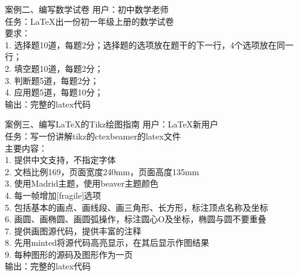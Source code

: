 \documentclass[aspectratio=169]{beamer}
\begin{document}
\begin{frame}[t]{案例二、编写数学试卷}
\fontsize{10pt}{14pt}\selectfont
\alert{用户：初中数学老师}\\
\alert{任务：LaTeX出一份初一年级上册的数学试卷}\\
要求：\\
1. 选择题10道，每题2分；选择题的选项放在题干的下一行，4个选项放在同一行；\\
2. 填空题10道，每题2分；\\
3. 判断题5道，每题2分；\\
4. 应用题5道，每题10分；\\
\alert{输出：完整的latex代码}
\end{frame}

\begin{frame}[t]{案例三、编写LaTeX的Tikz绘图指南}
\fontsize{12pt}{14pt}\selectfont
\alert{用户：LaTeX新用户}\\
\alert{任务：写一份讲解tikz的ctexbeamer的latex文件}\\
主要内容：\\
1. 提供中文支持，不指定字体\\
2. 文档比例169，页面宽度240mm，页面高度135mm\\
3. 使用Madrid主题，使用beaver主题颜色\\
4. 每一帧增加[fragile]选项\\
5. 包括基本的画点、画线段、画三角形、长方形，标注顶点名称及坐标\\
6. 画圆、画椭圆、画圆弧操作，标注圆心O及坐标，椭圆与圆不要重叠\\
7. 提供画图源代码，提供丰富的注释\\
8. 先用minted将源代码高亮显示，在其后显示作图结果\\
9. 每种图形的源码及图形作为一页\\
\alert{输出：完整的latex代码}
\end{frame}
\end{document}
